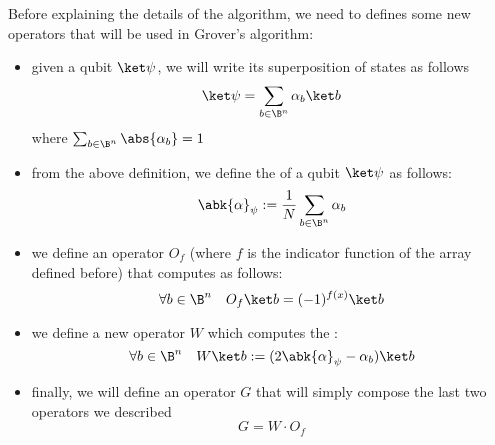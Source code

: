 \documentclass[a4paper, 12pt]{report}
\begin{document}
Before explaining the details of the algorithm, we need to defines some new operators that will be used in Grover's algorithm:

\begin{itemize}
    \item given a qubit $\ket \psi$, we will write its superposition of states as follows $$\ket \psi = \sum_{b \in \B^n}{\alpha_b \ket b}$$ where $\sum_{b \in \B^n}{\abs{\alpha_b}} = 1$
    \item from the above definition, we define the  of a qubit $\ket \psi$ as follows: $$\abk{\alpha}_\psi := \dfrac{1}{N}\sum_{b \in \B^n}{\alpha_b}$$
    \item we define an operator $O_f$ (where $f$ is the indicator function of the array defined before) that computes as follows: $$\forall b \in \B^n \quad O_f \ket b = (-1)^{f(x)} \ket b$$
    \item we define a new operator $W$ which computes the : $$\forall b \in \B^n \quad W \ket b := (2 \abk{\alpha}_\psi - \alpha_b)\ket b$$ 
    \item finally, we will define an operator $G$ that will simply compose the last two operators we described $$G = W \cdot O_f$$
\end{itemize}



\printbibliography %
\end{document}
